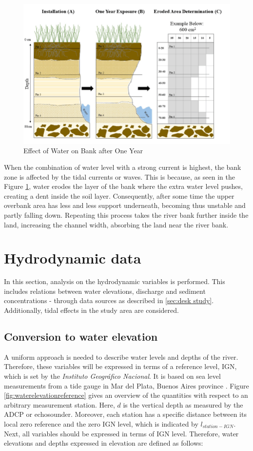 \begin{figure}[H]
    \centering
    \includegraphics[width=0.5\linewidth]{figures/ch2/Erosion.png}
    \caption{Effect of Water on Bank after One Year}
    \label{fig:Effect of Water on Bank after One Year}
\end{figure}

When the combination of water level with a strong current is highest, the bank zone is affected by the tidal currents or waves. This is because, as seen in the Figure \ref{fig:Effect of Water on Bank after One Year}, water erodes the layer of the bank where the extra water level pushes, creating a dent inside the soil layer.
Consequently, after some time the upper overbank area has less and less support underneath, becoming thus unstable and partly falling down. 
Repeating this process takes the river bank further inside the land, increasing the channel width, absorbing the land near the river bank.

\newpage
\section{Hydrodynamic data}
\label{sec:Hydrodynamic data}
In this section, analysis on the hydrodynamic variables is performed. This includes relations between water elevations, discharge and sediment concentrations - through data sources as described in \ref{sec:desk study}. Additionally, tidal effects in the study area are considered. 

\subsection{Conversion to water elevation}
A uniform approach is needed to describe water levels and depths of the river. Therefore, these variables will be expressed in terms of a reference level, IGN, which is set by the \textit{Instituto Geográfico Nacional}. It is based on sea level measurements from a tide gauge in Mar del Plata, Buenos Aires province \autocite{donofrioReferenciaVertical1999}. Figure \ref{fig:waterelevationreference} gives an overview of the quantities with respect to an arbitrary measurement station. Here, $d$ is the vertical depth as measured by the ADCP or echosounder. Moreover, each station has a specific distance between its local zero reference and the zero IGN level, which is indicated by $l_{station-IGN}$. Next, all variables should be expressed in terms of IGN level. Therefore, water elevations and depths expressed in elevation are defined as follows:

